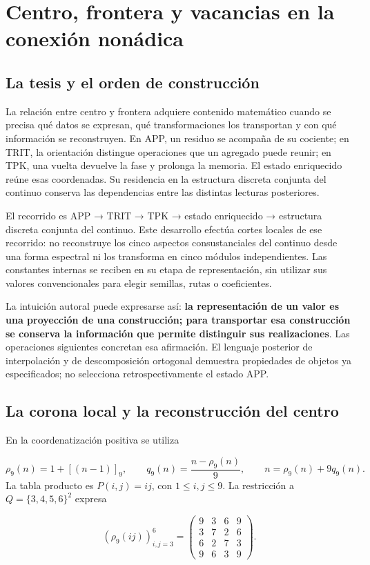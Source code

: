 \section{Centro, frontera y vacancias en la conexión nonádica}
\label{sec:centro-frontera}
\subsection{La tesis y el orden de construcción}
La relación entre centro y frontera adquiere contenido matemático cuando se precisa qué datos se expresan, qué transformaciones los transportan y con qué información se reconstruyen. En APP, un residuo se acompaña de su cociente; en TRIT, la orientación distingue operaciones que un agregado puede reunir; en TPK, una vuelta devuelve la fase y prolonga la memoria. El estado enriquecido reúne esas coordenadas. Su residencia en la estructura discreta conjunta del continuo conserva las dependencias entre las distintas lecturas posteriores.

El recorrido es APP → TRIT → TPK → estado enriquecido → estructura discreta conjunta del continuo. Este desarrollo efectúa cortes locales de ese recorrido: no reconstruye los cinco aspectos consustanciales del continuo desde una forma espectral ni los transforma en cinco módulos independientes. Las constantes internas se reciben en su etapa de representación, sin utilizar sus valores convencionales para elegir semillas, rutas o coeficientes.

La intuición autoral puede expresarse así: \textbf{la representación de un valor es una proyección de una construcción; para transportar esa construcción se conserva la información que permite distinguir sus realizaciones}. Las operaciones siguientes concretan esa afirmación. El lenguaje posterior de interpolación y de descomposición ortogonal demuestra propiedades de objetos ya especificados; no selecciona retrospectivamente el estado APP.

\subsection{La corona local y la reconstrucción del centro}
En la coordenatización positiva se utiliza

\[
\rho_9(n)=1+[(n-1)]_9,\qquad
q_9(n)=\frac{n-\rho_9(n)}9,
\qquad n=\rho_9(n)+9q_9(n).
\]
La tabla producto es \(P(i,j)=ij\), con \(1\leq i,j\leq9\). La restricción a \(Q=\{3,4,5,6\}^2\) expresa

\[
\left(\rho_9(ij)\right)_{i,j=3}^{6}=
\begin{pmatrix}
9&3&6&9\\
3&7&2&6\\
6&2&7&3\\
9&6&3&9
\end{pmatrix}.
\]


